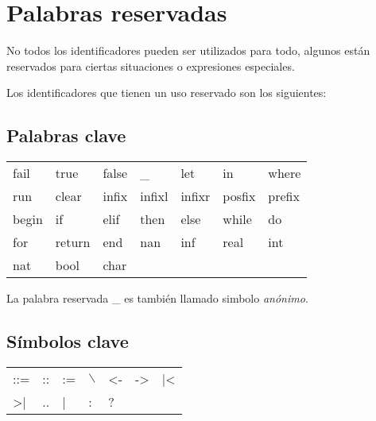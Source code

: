       \begin{fxcode}
          
      \end{fxcode}
      
      \begin{fxcode}
          
      \end{fxcode}
      
   \section{Palabras reservadas}
      No todos los identificadores pueden ser utilizados para todo, algunos están reservados para ciertas situaciones o expresiones especiales.
      
      Los identificadores que tienen un uso reservado son los siguientes:
      
      \subsection{Palabras clave}
      
      \begin{longtable}[c]{lllllll}
         fail   & true   & false  & \_     & let    & in  & where  \\
         run    & clear  & infix  & infixl & infixr & posfix & prefix \\ 
         begin  & if     & elif   & then & else & while & do \\
         for & return & end & nan & inf & real & int \\
         nat & bool & char & & & & \\  
      \end{longtable}
      
      La palabra reservada \_ es también llamado simbolo {\it anónimo}.
      
      \subsection{Símbolos clave}
      
      \begin{longtable}[c]{lllllll}
         ::=   & ::   & :=  & $\backslash$     & <-    & ->  & |<  \\
         >|    & ..  & |  & : & ? & & \\
      \end{longtable}
      
